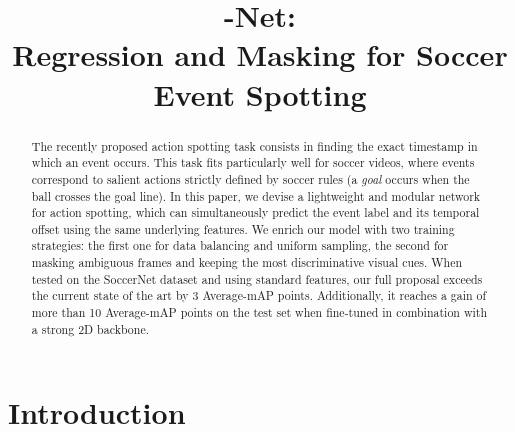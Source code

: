 \documentclass[a4paper,conference]{IEEEtran}
\def \OURS {-Net}
\begin{document}
\title{\OURS:\\Regression and Masking for Soccer Event Spotting}


\author{
}













\maketitle

\begin{abstract}
The recently proposed action spotting task consists in finding the exact timestamp in which an event occurs. This task fits particularly well for soccer videos, where events correspond to salient actions strictly defined by soccer rules (a \textit{goal} occurs when the ball crosses the goal line). In this paper, we devise a lightweight and modular network for action spotting, which can simultaneously predict the event label and its temporal offset using the same underlying features. We enrich our model with two training strategies: the first one for data balancing and uniform sampling, the second for masking ambiguous frames and keeping the most discriminative visual cues. When tested on the SoccerNet dataset and using standard features, our full proposal exceeds the current state of the art by 3 Average-mAP points. Additionally, it reaches a gain of more than 10 Average-mAP points on the test set when fine-tuned in combination with a strong 2D backbone.
\end{abstract}






\IEEEpeerreviewmaketitle



\section{Introduction}
\end{document}
